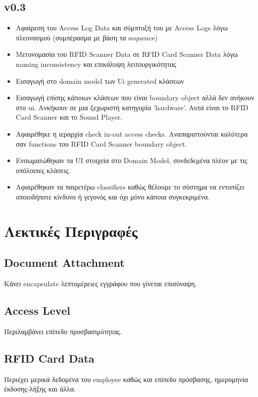 \documentclass{article}
\begin{document}
\subsection{v0.3}
\begin{itemize}
    \item Αφαίρεση του Access Log Data και σύμπτυξή του με Access Logs λόγω πλεονασμού (συμπέρασμα με βάση τα sequence)
    \item Μετονομασία του RFID Scanner Data σε RFID Card Scanner Data λόγω naming inconsistency και επικάλυψη λειτουργικότητας
    \item Εισαγωγή στο domain model των Ui generated κλάσεων
    \item Εισαγωγή επίσης κάποιων κλάσεων που είναι boundary object αλλά δεν ανήκουν στο ui. Ανκήκουν σε μια ξεχωριστή κατηγορία 'hardware'. Αυτά είναι το RFID Card Scanner και το Sound Player.
    \item Αφαιρέθηκε η ιεραρχία check in-out access checks. Αναπαριστούνται καλύτερα σαν functions του RFID Card Scanner boundary object.
    \item Ενσωματώθηκαν τα UI στοιχεία στο Domain Model, συνδεδεμένα πλέον με τις υπόλοιπες κλάσεις.
    \item Αφαιρέθηκαν τα παιρετέρω classifiers καθώς θέλουμε το σύστημα να εντοπίζει οποιοδήποτε κίνδυνο ή γεγονός και όχι μόνο κάποια συγκεκριμένα.
    
\end{itemize}

\section{Λεκτικές Περιγραφές}

\subsection{Document Attachment}
Κάνει encapsulate λεπτομέρειες εγγράφου που γίνεται επισύναψη.

\subsection{Access Level}
Περιλαμβάνει επίπεδο προσβασιμότητας.

\subsection{RFID Card Data}
Περιέχει μερικά δεδομένα του employee καθώς και επίπεδο πρόσβασης, ημερομηνία έκδοσης-λήξης και άλλα.
\end{document}
